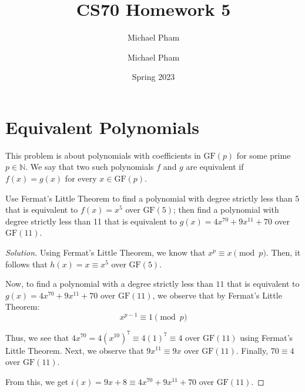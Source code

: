 \documentclass{article}
\title{#1}
\author{Michael Pham}
\date{#2}
\newenvironment{solution}{\begin{proof}[Solution]}{\end{proof}}
\newcommand{\NN}{\mathbb{N}}
\newcommand{\mytitle}[2]{%
	\title{#1}
	\author{Michael Pham}
	\date{#2}
	\maketitle
	\newpage
	\tableofcontents
	\newpage
}
\begin{document}
\mytitle{CS70 Homework 5}{Spring 2023}

\section{Equivalent Polynomials}
This problem is about polynomials with coefficients in $\mathrm{GF}(p)$ for some prime $p \in \NN$. We say that two such polynomials $f$ and $g$ are equivalent if $f(x) = g(x)$ for every $x \in \mathrm{GF}(p)$.

\begin{hw}
	Use Fermat's Little Theorem to find a polynomial with degree strictly less than 5 that is equivalent to $f(x) = x^5$ over $\text{GF}(5)$; then find a polynomial with degree strictly less than 11 that is equivalent to $g(x) = 4x^{70} + 9x^{11} + 70$ over $\text{GF}(11)$.
\end{hw}
\begin{solution}
	Using Fermat's Little Theorem, we know that $x^{p} \equiv x \pmod{p}$. Then, it follows that $h(x) = x \equiv x^{5}$ over $\mathrm{GF}(5)$.
	
	Now, to find a polynomial with a degree strictly less than $11$ that is equivalent to $g(x) = 4x^{70} + 9x^{11} + 70$ over $\mathrm{GF}(11)$, we observe that by Fermat's Little Theorem:
	\begin{equation*}
		x^{p-1} \equiv 1 \pmod{p}
	\end{equation*}
	
	Thus, we see that $4x^{70} = 4(x^{10})^{7} \equiv 4(1)^{7} \equiv 4$ over $\mathrm{GF}(11)$ using Fermat's Little Theorem. Next, we observe that $9x^{11} \equiv 9x$ over $\mathrm{GF}(11)$. Finally, $70 \equiv 4$ over $\mathrm{GF}(11)$.
	
	From this, we get $i(x) = 9x + 8 \equiv 4x^{70} + 9x^{11} + 70$ over $\mathrm{GF}(11)$. 
\end{solution}
\end{document}
